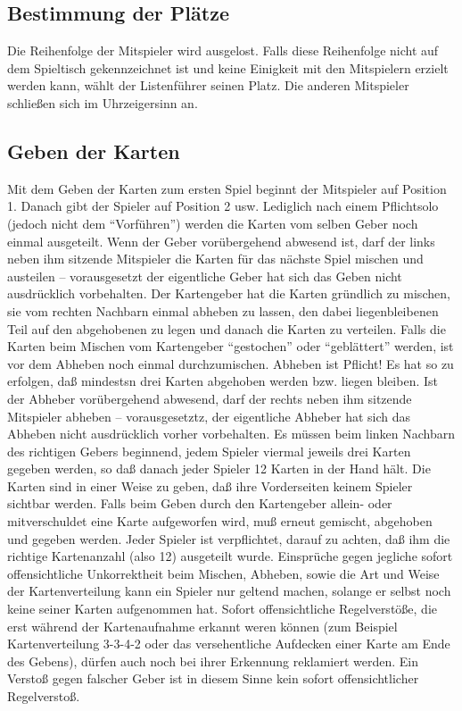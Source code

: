 \documentclass[12pt]{scrartcl}
\begin{document}
\subsection{Bestimmung der Plätze}
Die Reihenfolge der Mitspieler wird ausgelost. Falls diese
Reihenfolge nicht auf dem Spieltisch gekennzeichnet ist und keine
Einigkeit mit den Mitspielern erzielt werden kann, wählt der
Listenführer seinen Platz. Die anderen Mitspieler schließen
sich im Uhrzeigersinn an.

\subsection{Geben der Karten}
Mit dem Geben der Karten zum ersten Spiel beginnt der Mitspieler
auf Position 1. Danach gibt der Spieler auf Position 2 usw.
Lediglich nach einem Pflichtsolo (jedoch nicht dem "`Vorführen"')
werden die Karten vom selben Geber noch einmal ausgeteilt. Wenn
der Geber vorübergehend abwesend ist, darf der links neben ihm
sitzende Mitspieler die Karten für das nächste Spiel mischen
und austeilen -- vorausgesetzt der eigentliche Geber hat sich das
Geben nicht ausdrücklich vorbehalten. Der Kartengeber hat die
Karten gründlich zu mischen, sie vom rechten Nachbarn einmal
abheben zu lassen, den dabei liegenbleibenen Teil auf den
abgehobenen zu legen und danach die Karten zu verteilen. Falls
die Karten beim Mischen vom Kartengeber "`gestochen"' oder
"`geblättert"' werden, ist vor dem Abheben noch einmal
durchzumischen. Abheben ist Pflicht! Es hat so zu erfolgen, daß
mindestsn drei Karten abgehoben werden bzw. liegen bleiben. Ist
der Abheber vorübergehend abwesend, darf der rechts neben ihm
sitzende Mitspieler abheben -- vorausgesetztz, der eigentliche
Abheber hat sich das Abheben nicht ausdrücklich vorher
vorbehalten. Es müssen beim linken Nachbarn des richtigen Gebers
beginnend, jedem Spieler viermal jeweils drei Karten gegeben
werden, so daß danach jeder Spieler 12 Karten in der Hand hält.
Die Karten sind in einer Weise zu geben, daß ihre Vorderseiten
keinem Spieler sichtbar werden. Falls beim Geben durch den
Kartengeber allein- oder mitverschuldet eine Karte aufgeworfen
wird, muß erneut gemischt, abgehoben und gegeben werden. Jeder
Spieler ist verpflichtet, darauf zu achten, daß ihm die richtige
Kartenanzahl (also 12) ausgeteilt wurde. Einsprüche gegen
jegliche sofort offensichtliche Unkorrektheit beim Mischen,
Abheben, sowie die Art und Weise der Kartenverteilung kann ein
Spieler nur geltend machen, solange er selbst noch keine seiner
Karten aufgenommen hat. Sofort offensichtliche Regelverstöße,
die erst während der Kartenaufnahme erkannt weren können (zum
Beispiel Kartenverteilung 3-3-4-2 oder das versehentliche
Aufdecken einer Karte am Ende des Gebens), dürfen auch noch bei
ihrer Erkennung reklamiert werden. Ein Verstoß gegen falscher
Geber ist in diesem Sinne kein sofort offensichtlicher
Regelverstoß.
\end{document}
